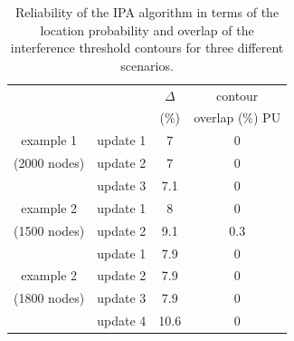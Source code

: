\begin{table}
\caption{\label{tab:locProbEffect}Reliability of the IPA algorithm in terms of the location probability and overlap of the interference threshold contours for three different scenarios. }

\vspace{0mm}
\begin{tabular}{cccc}
\hline
          	&                 & $\Delta$ &	contour				\\
          	&                 & ($\%$)	& overlap ($\%$) PU	\\\hline
 example 1	& update 1				&	7				&	0							\\
 (2000 nodes)&update 2      	&	7				&	0							\\
            & update 3       	&	7.1			& 0							\\\hline 
 example 2	& update 1      	&	8				& 0							\\ 
 (1500 nodes)& update 2				& 9.1			& 0.3						\\\hline
            & update 1 				& 7.9			&	0							\\	
 example 2	& update 2 				& 7.9			&	0							\\	
 (1800 nodes)& update 3 			& 7.9			&	0							\\	
	          & update 4 				& 10.6			&	0							\\\hline		            

\end{tabular}
\vspace{-5mm}
\end{table}

